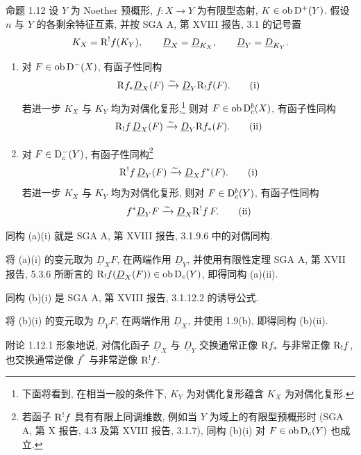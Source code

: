 \begin{statement}{命题 1.12}
设 $Y$ 为 Noether 预概形, $f:X\to Y$ 为有限型态射, $K\in\operatorname{ob}\mathrm{D}^+(Y)$. 假设 $n$ 与 $Y$ 的各剩余特征互素, 并按 SGA A, 第 XVIII 报告, 3.1 的记号置
\[
   K_X=\mathrm R^!f(K_Y),\qquad \underline D_X=\underline D_{K_X},\qquad \underline D_Y=\underline D_{K_Y}.
\]
\begin{enumerate}[label=\alph*)]
\item 对 $F\in\operatorname{ob}\mathrm{D}^-(X)$, 有函子性同构
\begin{equation}
\mathrm R f_*\underline D_X(F)\xrightarrow{\sim}\underline D_Y\mathrm R_!f(F).\tag{i}
\end{equation}
若进一步 $K_X$ 与 $K_Y$ 均为对偶化复形,\footnote{下面将看到, 在相当一般的条件下, $K_Y$ 为对偶化复形蕴含 $K_X$ 为对偶化复形.} 则对 $F\in\operatorname{ob}\mathrm{D}_c^b(X)$, 有函子性同构
\begin{equation}
\mathrm R_!f\,\underline D_X(F)\xrightarrow{\sim}\underline D_Y\mathrm R f_*(F).\tag{ii}
\end{equation}

\item 对 $F\in\mathrm{D}_c^-(Y)$, 有函子性同构\footnote{若函子 $\mathrm R^!f$ 具有有限上同调维数, 例如当 $Y$ 为域上的有限型预概形时 (SGA A, 第 X 报告, 4.3 及第 XVIII 报告, 3.1.7), 同构 (b)(i) 对 $F\in\operatorname{ob}\mathrm{D}_c(Y)$ 也成立.}
\begin{equation}
\mathrm R^!f\,\underline D_Y(F)\xrightarrow{\sim}\underline D_X f^*(F).\tag{i}
\end{equation}
若进一步 $K_X$ 与 $K_Y$ 均为对偶化复形, 则对 $F\in\mathrm{D}_c^b(Y)$, 有函子性同构
\begin{equation}
f^*\underline D_YF\xrightarrow{\sim}\underline D_X\mathrm R^!f\,F.\tag{ii}
\end{equation}
\end{enumerate}
\end{statement}

\begin{prooftext}
同构 (a)(i) 就是 SGA A, 第 XVIII 报告, 3.1.9.6 中的对偶同构.

将 (a)(i) 的变元取为 $\underline D_XF$, 在两端作用 $\underline D_Y$, 并使用有限性定理 SGA A, 第 XVII 报告, 5.3.6 所断言的 $\mathrm R_!f(\underline D_X(F))\in\operatorname{ob}\mathrm{D}_c(Y)$, 即得同构 (a)(ii).

同构 (b)(i) 是 SGA A, 第 XVIII 报告, 3.1.12.2 的诱导公式.

将 (b)(i) 的变元取为 $\underline D_YF$, 在两端作用 $\underline D_X$, 并使用 1.9(b), 即得同构 (b)(ii). \qedtext
\end{prooftext}

\begin{statement}{附论 1.12.1}
形象地说, 对偶化函子 $\underline D_X$ 与 $\underline D_Y$ 交换通常正像 $\mathrm R f_*$ 与非常正像 $\mathrm R_!f$, 也交换通常逆像 $f^*$ 与非常逆像 $\mathrm R^!f$.
\end{statement}

